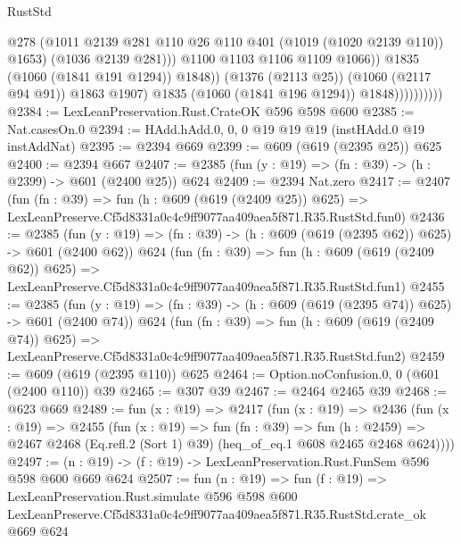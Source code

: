 \begin{lexlean}{RustStd}
\begin{coremodule}
                                      @278
                                      (@1011
                                        @2139
                                        @281
                                        @110
                                        @26
                                        @110
                                        @401
                                        (@1019 (@1020 @2139 @110))
                                        @1653)
                                      (@1036 @2139 @281)))
                                  @1100
                                  @1103
                                  @1106
                                  @1109
                                  @1066))
                              @1835
                              (@1060 (@1841 @191 @1294))
                              @1848))
                          (@1376 (@2113 @25))
                          (@1060 (@2117 @94 @91))
                          @1863
                          @1907)
                        @1835
                        (@1060 (@1841 @196 @1294))
                        @1848))))))))))
@2384 := LexLeanPreservation.Rust.CrateOK @596 @598 @600
@2385 := Nat.casesOn.{0}
@2394 := HAdd.hAdd.{0, 0, 0} @19 @19 @19 (instHAdd.{0} @19 instAddNat)
@2395 := @2394 @669
@2399 := @609 (@619 (@2395 @25)) @625
@2400 := @2394 @667
@2407 := @2385 (fun (y : @19) => (fn : @39) -> (h : @2399) -> @601 (@2400 @25)) @624
@2409 := @2394 Nat.zero
@2417 := @2407
    (fun (fn : @39) =>
    fun (h : @609 (@619 (@2409 @25)) @625) =>
    LexLeanPreserve.Cf5d8331a0c4c9ff9077aa409aea5f871.R35.RustStd.fun0)
@2436 := @2385
    (fun (y : @19) => (fn : @39) -> (h : @609 (@619 (@2395 @62)) @625) -> @601 (@2400 @62))
    @624
    (fun (fn : @39) =>
    fun (h : @609 (@619 (@2409 @62)) @625) =>
    LexLeanPreserve.Cf5d8331a0c4c9ff9077aa409aea5f871.R35.RustStd.fun1)
@2455 := @2385
    (fun (y : @19) => (fn : @39) -> (h : @609 (@619 (@2395 @74)) @625) -> @601 (@2400 @74))
    @624
    (fun (fn : @39) =>
    fun (h : @609 (@619 (@2409 @74)) @625) =>
    LexLeanPreserve.Cf5d8331a0c4c9ff9077aa409aea5f871.R35.RustStd.fun2)
@2459 := @609 (@619 (@2395 @110)) @625
@2464 := Option.noConfusion.{0, 0} (@601 (@2400 @110)) @39
@2465 := @307 @39
@2467 := @2464 @2465 @39
@2468 := @623 @669
@2489 := fun (x : @19) =>
  @2417
    (fun (x : @19) =>
    @2436
      (fun (x : @19) =>
      @2455
        (fun (x : @19) =>
        fun (fn : @39) =>
        fun (h : @2459) =>
        @2467 @2468 (Eq.refl.{2} (Sort 1) @39) (heq_of_eq.{1} @608 @2465 @2468 @624))))
@2497 := (n : @19) -> (f : @19) -> LexLeanPreservation.Rust.FunSem @596 @598 @600 @669 @624
@2507 := fun (n : @19) =>
  fun (f : @19) =>
  LexLeanPreservation.Rust.simulate
    @596
    @598
    @600
    LexLeanPreserve.Cf5d8331a0c4c9ff9077aa409aea5f871.R35.RustStd.crate_ok
    @669
    @624
\end{coremodule}
\end{lexlean}
